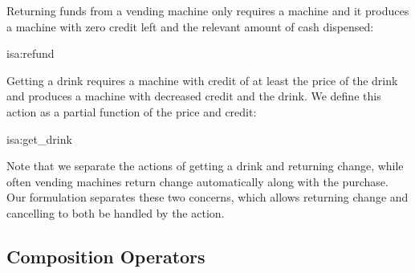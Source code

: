 \documentclass[class=smolathesis,crop=false]{standalone}
\begin{document}
Returning funds from a vending machine only requires a machine and it produces a machine with zero credit left and the relevant amount of cash dispensed:
\begin{isadef}{isa:refund}
  
\end{isadef}

Getting a drink requires a machine with credit of at least the price of the drink and produces a machine with decreased credit and the drink.
We define this action as a partial function of the price and credit:
\begin{isadef}{isa:get_drink}
  
\end{isadef}

Note that we separate the actions of getting a drink and returning change, while often vending machines return change automatically along with the purchase.
Our formulation separates these two concerns, which allows returning change and cancelling to both be handled by the  action.

\subsection{Composition Operators}
\label{sec:proc/type/comp}
\end{document}
